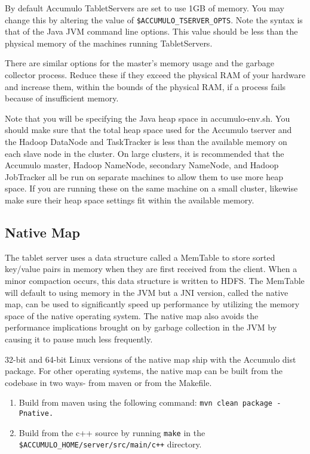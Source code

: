 By default Accumulo TabletServers are set to use 1GB of memory. You may change
this by altering the value of \texttt{\$ACCUMULO\_TSERVER\_OPTS}. Note the syntax is that of
the Java JVM command line options. This value should be less than the physical
memory of the machines running TabletServers.

There are similar options for the master's memory usage and the garbage collector
process. Reduce these if they exceed the physical RAM of your hardware and
increase them, within the bounds of the physical RAM, if a process fails because of
insufficient memory.

Note that you will be specifying the Java heap space in accumulo-env.sh. You should
make sure that the total heap space used for the Accumulo tserver and the Hadoop
DataNode and TaskTracker is less than the available memory on each slave node in
the cluster. On large clusters, it is recommended that the Accumulo master, Hadoop
NameNode, secondary NameNode, and Hadoop JobTracker all be run on separate
machines to allow them to use more heap space. If you are running these on the
same machine on a small cluster, likewise make sure their heap space settings fit
within the available memory.

\subsection{Native Map}

The tablet server uses a data structure called a MemTable to store sorted key/value
pairs in memory when they are first received from the client. When a minor compaction
occurs, this data structure is written to HDFS. The MemTable will default to using
memory in the JVM but a JNI version, called the native map, can be used to significantly
speed up performance by utilizing the memory space of the native operating system. The
native map also avoids the performance implications brought on by garbage collection
in the JVM by causing it to pause much less frequently.

32-bit and 64-bit Linux versions of the native map ship with the Accumulo dist package.
For other operating systems, the native map can be built from the codebase in two ways-
from maven or from the Makefile.

\begin{enumerate}
\item{Build from maven using the following command: \texttt{mvn clean package -Pnative.}}
\item{Build from the c++ source by running \texttt{make} in the \texttt{\$ACCUMULO\_HOME/server/src/main/c++} directory.}
\end{enumerate}

